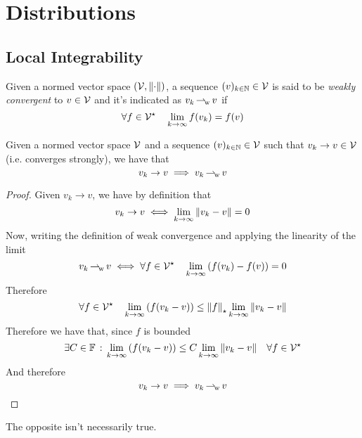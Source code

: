 \documentclass[../complete.tex]{subfiles}
\begin{document}
\section{Distributions}
\subsection{Local Integrability}
\begin{dfn}
	Given a normed vector space $(\mathcal{V},\norm{\cdot})$, a sequence $(v)_{k\in\mathbb{N}}\in\mathcal{V}$ is said to be \textit{weakly convergent} to $v\in\mathcal{V}$ and it's indicated as $v_k\operatorname{\rightharpoonup_{\! w}} v$ if
	\begin{equation*}
		\forall f\in\mathcal{V}^\star\quad\lim_{k\to\infty}f(v_k)=f(v)
	\end{equation*}
\end{dfn}
\begin{thm}
	Given a normed vector space $\mathcal{V}$ and a sequence $(v)_{k\in\mathbb{N}}\in\mathcal{V}$ such that $v_k\to v\in\mathcal{V}$ (i.e. converges strongly), we have that
	\begin{equation*}
		v_k\to v\implies v_k\operatorname{\rightharpoonup_{\! w}} v
	\end{equation*}
\end{thm}
\begin{proof}
	Given $v_k\to v$, we have by definition that
	\begin{equation*}
		v_k\to v\iff\lim_{k\to\infty}\norm{v_k-v}=0
	\end{equation*}
	Now, writing the definition of weak convergence and applying the linearity of the limit
	\begin{equation*}
		v_k\operatorname{\rightharpoonup_{\! w}} v\iff\forall f\in\mathcal{V}^\star\quad\lim_{k\to\infty}\left( f(v_k)-f(v) \right)=0
	\end{equation*}
	Therefore
	\begin{equation*}
		\forall f\in\mathcal{V}^\star\quad\lim_{k\to\infty}\left( f(v_k-v) \right)\le\norm{f}_{\star}\lim_{k\to\infty}\norm{v_k-v}
	\end{equation*}
	Therefore we have that, since $f$ is bounded
	\begin{equation*}
		\exists C\in\mathbb{F}\, :\, \lim_{k\to\infty}\left( f(v_k-v) \right)\le C\lim_{k\to\infty}\norm{v_k-v}\quad\forall f\in\mathcal{V}^\star
	\end{equation*}
	And therefore
	\begin{equation*}
		v_k\to v\implies v_k\operatorname{\rightharpoonup_{\! w}} v
	\end{equation*}
\end{proof}
\begin{rmk}
	The opposite isn't necessarily true.
\end{rmk}
\end{document}
